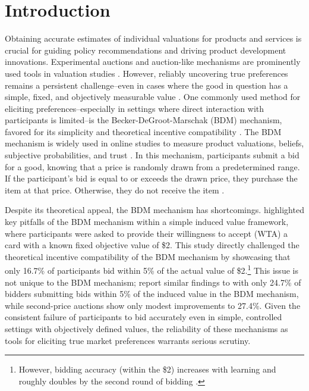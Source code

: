 \documentclass[12pt]{article}
\begin{document}
\section{Introduction}
Obtaining accurate estimates of individual valuations for products and services is crucial for guiding policy recommendations and driving product development innovations. Experimental auctions and auction-like mechanisms are prominently used tools in valuation studies \citep{lusk2007experimental,canavari2019run}. However, reliably uncovering true preferences remains a persistent challenge--even in cases where the good in question has a simple, fixed, and objectively measurable value \citep{drichoutis2022game, cason_misconceptions_2014}. One commonly used method for eliciting preferences--especially in settings where direct interaction with participants is limited--is the Becker-DeGroot-Marschak (BDM) mechanism,  favored for its simplicity and theoretical incentive compatibility \citep{mamadehussene2023reliability, azrieli2018incentives}. The BDM mechanism is widely used in online studies to measure product valuations, beliefs, subjective probabilities, and trust  \citep{mamadehussene2023reliability, ahles_testing_2024, burdea2022online}. In this mechanism, participants submit a bid for a good, knowing that a price is randomly drawn from a predetermined range. If the participant's bid is equal to or exceeds the drawn price, they purchase the item at that price. Otherwise, they do not receive the item \citep{becker_measuring_1964}.

Despite its theoretical appeal, the BDM mechanism has shortcomings. %
\citet{cason_misconceptions_2014} highlighted key pitfalls of the BDM mechanism within a simple induced value framework, where participants were asked to provide their willingness to accept (WTA) a card with a known fixed objective value of \$2. This study directly challenged the theoretical incentive compatibility of the BDM mechanism by showcasing that only 16.7\% of participants bid within 5\% of the actual value of \$2.\footnote{However, bidding accuracy (within the \$2) increases with learning and roughly doubles by the second round of bidding \cite{cason_misconceptions_2014}.} This issue is not unique to the BDM mechanism; \citet{DrichoutisEtAl2024incentives} report similar findings to \citet{cason_misconceptions_2014} with only 24.7\% of bidders submitting bids within 5\% of the induced value in the BDM mechanism, while second-price auctions show only modest improvements to 27.4\%. Given the consistent failure of participants to bid accurately even in simple, controlled settings with objectively defined values, the reliability of these mechanisms as tools for eliciting true market preferences warrants serious scrutiny.
\end{document}
